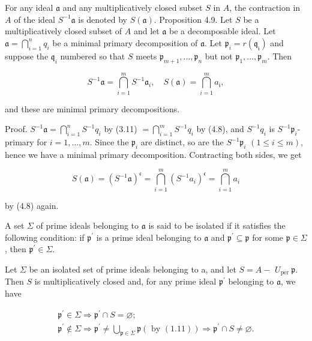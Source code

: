\documentclass{standalone}
\theoremstyle{definition}
\theoremstyle{remark}
\begin{document}
For any ideal $\mathfrak{a}$ and any multiplicatively closed subset $S$ in $A$,
the contraction in $A$ of the ideal $S^{-1} \mathfrak{a}$ is denoted by
$S(\mathfrak{a})$. Proposition 4.9. Let $S$ be a multiplicatively closed subset
of $A$ and let $\mathfrak{a}$ be a decomposable ideal. Let
$\mathfrak{a}=\bigcap_{i=1}^{n} q_{i}$ be a minimal primary decomposition of
$\mathfrak{a}$. Let $\mathfrak{p}_{i}=r\left(\mathfrak{q}_{\mathfrak{i}}\right)$
and suppose the $\mathfrak{q}_{i}$ numbered so that $S$ meets
$\mathfrak{p}_{m+1}, \ldots, \mathfrak{p}_{n}$ but not $\mathfrak{p}_{1},
\ldots, \mathfrak{p}_{m}$. Then

\[
S^{-1} \mathfrak{a}=\bigcap_{i=1}^{m} S^{-1} \mathfrak{a}_{i}, \quad S(\mathfrak{a})=\bigcap_{i=1}^{m} a_{\mathfrak{i}},
\]

and these are minimal primary decompositions.

Proof. $S^{-1} \mathfrak{a}=\bigcap_{i=1}^{n} S^{-1} q_{i}$ by (3.11)
$=\bigcap_{i=1}^{m} S^{-1} q_{i}$ by (4.8), and $S^{-1} q_{i}$ is $S^{-1}
\mathfrak{p}_{i}$-primary for $i=1, \ldots, m$. Since the $\mathfrak{p}_{i}$ are
distinct, so are the $S^{-1} \mathfrak{p}_{i}$ $(1 \leqslant i \leqslant m)$,
hence we have a minimal primary decomposition. Contracting both sides, we get

\[
S(\mathfrak{a})=\left(S^{-1} \mathfrak{a}\right)^{\mathfrak{c}}=\bigcap_{i=1}^{m}\left(S^{-1} a_{i}\right)^{\mathfrak{c}}=\bigcap_{i=1}^{m} a_{i}
\]

by (4.8) again.

A set $\Sigma$ of prime ideals belonging to $\mathfrak{a}$ is said to be
isolated if it satisfies the following condition: if $\mathfrak{p}^{\prime}$ is
a prime ideal belonging to $\mathfrak{a}$ and $\mathfrak{p}^{\prime} \subseteq
\mathfrak{p}$ for some $\mathfrak{p} \in \Sigma$, then $\mathfrak{p}^{\prime}
\in \Sigma$.

Let $\Sigma$ be an isolated set of prime ideals belonging to a, and let $S=A-$
$U_{\text {per }} \mathfrak{p}$. Then $S$ is multiplicatively closed and, for
any prime ideal $\mathfrak{p}^{\prime}$ belonging to $\mathfrak{a}$, we have

\[
\begin{gathered}
\mathfrak{p}^{\prime} \in \Sigma \Rightarrow \mathfrak{p}^{\prime} \cap S=\varnothing ; \\
\mathfrak{p}^{\prime} \notin \Sigma \Rightarrow \mathfrak{p}^{\prime} \neq \bigcup_{\mathfrak{p} \in \mathbb{\Sigma}} \mathfrak{p}(\text { by }(1.11)) \Rightarrow \mathfrak{p}^{\prime} \cap S \neq \varnothing .
\end{gathered}
\]
\end{document}

